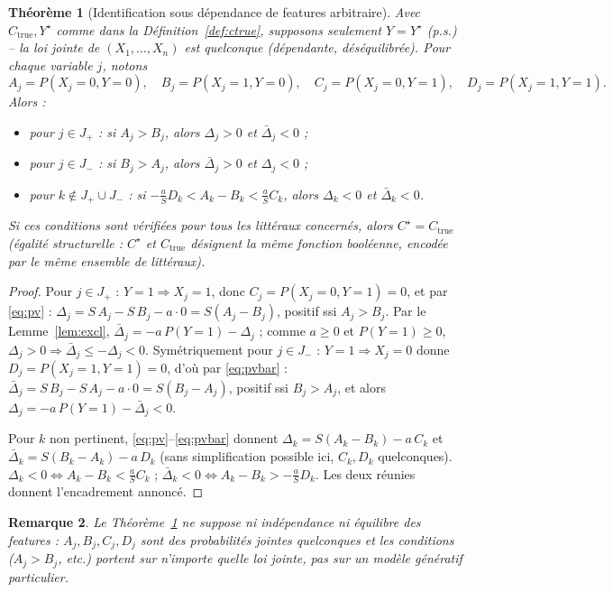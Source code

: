 \documentclass[12pt,a4paper]{article}
\newtheorem{theorem}{Théorème}
\newtheorem{remark}[theorem]{Remarque}
\begin{document}
\begin{theorem}[Identification sous dépendance de features arbitraire]\label{thm:identif}
Avec $C_{\mathrm{true}},Y^\star$ comme dans la Définition~\ref{def:ctrue},
supposons seulement $Y=Y^\star$ (p.s.) -- la loi jointe de
$(X_1,\ldots,X_n)$ est quelconque (dépendante, déséquilibrée). Pour chaque
variable $j$, notons
\[
  A_j=P(X_j{=}0,Y{=}0),\quad B_j=P(X_j{=}1,Y{=}0),\quad
  C_j=P(X_j{=}0,Y{=}1),\quad D_j=P(X_j{=}1,Y{=}1).
\]
Alors :
\begin{itemize}
  \item pour $j\in J_+$ : si $A_j>B_j$, alors $\Delta_j>0$ et $\bar\Delta_j<0$ ;
  \item pour $j\in J_-$ : si $B_j>A_j$, alors $\bar\Delta_j>0$ et $\Delta_j<0$ ;
  \item pour $k\notin J_+\cup J_-$ : si $-\tfrac aS D_k < A_k-B_k < \tfrac aS C_k$,
  alors $\Delta_k<0$ et $\bar\Delta_k<0$.
\end{itemize}
Si ces conditions sont vérifiées pour tous les littéraux concernés, alors
$C^\star=C_{\mathrm{true}}$ (égalité structurelle : $C^\star$ et
$C_{\mathrm{true}}$ désignent la même fonction booléenne, encodée par le
même ensemble de littéraux).
\end{theorem}

\begin{proof}
Pour $j\in J_+$ : $Y{=}1\Rightarrow X_j{=}1$, donc $C_j=P(X_j{=}0,Y{=}1)=0$,
et par \eqref{eq:pv} : $\Delta_j=S\,A_j-S\,B_j-a\cdot0=S(A_j-B_j)$, positif
ssi $A_j>B_j$. Par le Lemme~\ref{lem:excl}, $\bar\Delta_j=-a\,P(Y{=}1)-\Delta_j$ ;
comme $a\ge0$ et $P(Y{=}1)\ge0$, $\Delta_j>0\Rightarrow\bar\Delta_j\le-\Delta_j<0$.
Symétriquement pour $j\in J_-$ : $Y{=}1\Rightarrow X_j{=}0$ donne
$D_j=P(X_j{=}1,Y{=}1)=0$, d'où par \eqref{eq:pvbar} :
$\bar\Delta_j=S\,B_j-S\,A_j-a\cdot0=S(B_j-A_j)$, positif ssi $B_j>A_j$, et
alors $\Delta_j=-a\,P(Y{=}1)-\bar\Delta_j<0$.

Pour $k$ non pertinent, \eqref{eq:pv}--\eqref{eq:pvbar} donnent
$\Delta_k=S(A_k-B_k)-a\,C_k$ et $\bar\Delta_k=S(B_k-A_k)-a\,D_k$ (sans
simplification possible ici, $C_k,D_k$ quelconques). $\Delta_k<0\iff
A_k-B_k<\tfrac aS C_k$ ; $\bar\Delta_k<0\iff A_k-B_k>-\tfrac aS D_k$. Les deux
réunies donnent l'encadrement annoncé.
\end{proof}

\begin{remark}
Le Théorème~\ref{thm:identif} ne suppose ni indépendance ni équilibre des
features : $A_j,B_j,C_j,D_j$ sont des probabilités jointes quelconques et les
conditions ($A_j>B_j$, etc.) portent sur n'importe quelle loi jointe, pas sur
un modèle génératif particulier.
\end{remark}
\end{document}
